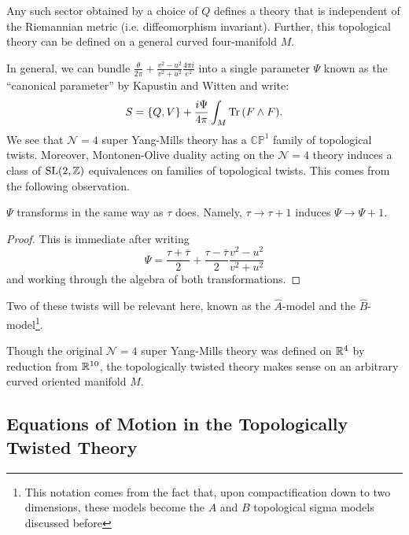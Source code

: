	\begin{fact}
		Any such sector obtained by a choice of $Q$ defines a theory that is independent of the Riemannian metric (i.e. diffeomorphism invariant). Further, this topological theory can be defined on a general curved four-manifold $M$.
	\end{fact}
	
	In general, we can bundle $\frac{\theta}{2\pi} +  \frac{v^2-u^2}{v^2+u^2} \frac{4\pi i}{e^2}$ into a single parameter $\Psi$ known as the ``canonical parameter'' by Kapustin and Witten \cite{kapustin2006} and write:
	\[
		S = \{ Q, V\} + \frac{i \Psi}{4\pi} \int_M \mathrm{Tr}\, (F \wedge F).
	\]
	We see that $\mathcal N = 4$ super Yang-Mills theory has a $\mathbb{CP}^1$ family of topological twists. Moreover, Montonen-Olive duality acting on the $\mathcal N=4$ theory induces a class of $\mathrm{SL}(2, \mathbb{Z})$ equivalences on families of topological twists. This comes from the following observation. 
	\begin{obs}
		$\Psi$ transforms in the same way as $\tau$ does. Namely, $\tau \to \tau+1$ induces $\Psi \to \Psi + 1$.
	\end{obs}
	\begin{proof}
		This is immediate after writing
		\[
			\Psi = \frac{\tau + \overline \tau}{2} + \frac{\tau - \overline \tau}{2} \frac{v^2-u^2}{v^2+u^2}
		\]
		and working through the algebra of both transformations.
	\end{proof}
	
	\noindent Two of these twists will be relevant here, known as the $\hat A$-model and the $\hat B$-model\footnote{This notation comes from the fact that, upon compactification down to two dimensions, these models become the $A$ and $B$ topological sigma models discussed before}. %
	
	\begin{nb}
		Though the original $\mathcal N=4$ super Yang-Mills theory was defined on $\mathbb{R}^4$ by reduction from $\mathbb{R}^{10}$, the topologically twisted theory makes sense on an arbitrary curved oriented manifold $M$.
	\end{nb}
	

\subsection{Equations of Motion in the Topologically Twisted Theory} %
\label{sub:equations_of_motion_in_the_topologically_twisted_theory}

